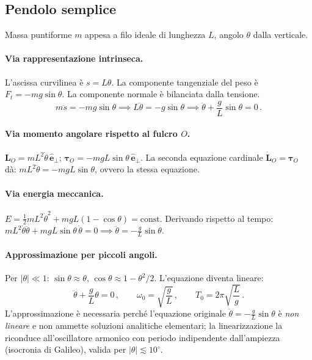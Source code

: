 \documentclass[11pt,a4paper]{article}
\renewcommand{\vec}[1]{\bm{#1}}
\theoremstyle{plain}
\theoremstyle{definition}
\theoremstyle{remark}
\begin{document}
\subsection{Pendolo semplice}

Massa puntiforme $m$ appesa a filo ideale di lunghezza $L$, angolo $\theta$
dalla verticale.

\paragraph{Via rappresentazione intrinseca.}
L'ascissa curvilinea è $s=L\theta$. La componente tangenziale del peso è
$F_t=-mg\sin\theta$. La componente normale è bilanciata dalla tensione.
\[
  m\ddot s=-mg\sin\theta \implies L\ddot\theta=-g\sin\theta
  \implies \ddot\theta+\frac{g}{L}\sin\theta=0\,.
\]

\paragraph{Via momento angolare rispetto al fulcro $O$.}
$\vec{L}_O=mL^2\dot\theta\,\hat{\bm{e}}_\perp$;
$\vec{\tau}_O=-mgL\sin\theta\,\hat{\bm{e}}_\perp$.
La seconda equazione cardinale $\dot{\vec{L}}_O=\vec{\tau}_O$ dà:
$mL^2\ddot\theta=-mgL\sin\theta$, ovvero la stessa equazione.

\paragraph{Via energia meccanica.}
$E=\tfrac{1}{2}mL^2\dot\theta^2+mgL(1-\cos\theta)=\mathrm{const}$.
Derivando rispetto al tempo:
$mL^2\dot\theta\ddot\theta+mgL\sin\theta\,\dot\theta=0\implies\ddot\theta=-\tfrac{g}{L}\sin\theta$.

\paragraph{Approssimazione per piccoli angoli.}
Per $|\theta|\ll1$: $\sin\theta\approx\theta$, $\cos\theta\approx1-\theta^2/2$.
L'equazione diventa lineare:
\[
  \ddot\theta+\frac{g}{L}\theta=0\,,\qquad
  \omega_0=\sqrt{\frac{g}{L}}\,,\qquad
  T_0=2\pi\sqrt{\frac{L}{g}}\,.
\]
L'approssimazione è necessaria perché l'equazione originale $\ddot\theta=-\tfrac{g}{L}\sin\theta$
è \emph{non lineare} e non ammette soluzioni analitiche elementari; la
linearizzazione la riconduce all'oscillatore armonico con periodo
indipendente dall'ampiezza (isocronia di Galileo), valida per
$|\theta|\lesssim 10^\circ$.

\end{document}
